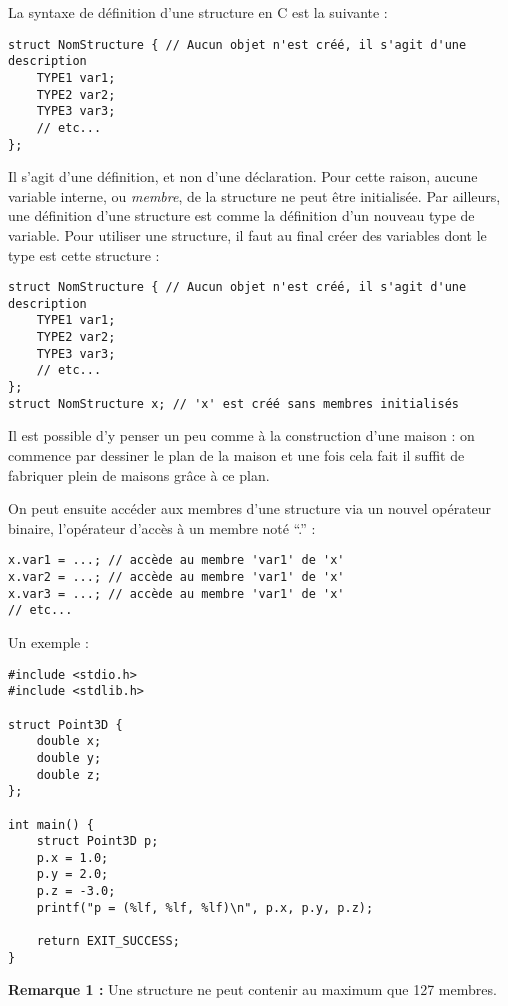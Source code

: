 \documentclass[../../../main.tex]{subfiles}
\begin{document}
La syntaxe de définition d'une structure en C est la suivante :
\begin{verbatim}
struct NomStructure { // Aucun objet n'est créé, il s'agit d'une description
	TYPE1 var1;
	TYPE2 var2;
	TYPE3 var3;
	// etc...
};
\end{verbatim}
Il s'agit d'une définition, et non d'une déclaration. Pour cette raison, aucune variable interne, ou \textit{membre}, de la structure ne peut être initialisée. Par ailleurs, une définition d'une structure est comme la définition d'un nouveau type de variable. Pour utiliser une structure, il faut au final créer des variables dont le type est cette structure :
\begin{verbatim}
struct NomStructure { // Aucun objet n'est créé, il s'agit d'une description
	TYPE1 var1;
	TYPE2 var2;
	TYPE3 var3;
	// etc...
};
struct NomStructure x; // 'x' est créé sans membres initialisés
\end{verbatim}
Il est possible d'y penser un peu comme à la construction d'une maison : on commence par dessiner le plan de la maison et une fois cela fait il suffit de fabriquer plein de maisons grâce à ce plan.
 
On peut ensuite accéder aux membres d'une structure via un nouvel opérateur binaire, l'opérateur d'accès à un membre noté ``.'' :
\begin{verbatim}
x.var1 = ...; // accède au membre 'var1' de 'x'
x.var2 = ...; // accède au membre 'var1' de 'x'
x.var3 = ...; // accède au membre 'var1' de 'x'
// etc...
\end{verbatim}
Un exemple :
\begin{verbatim}
#include <stdio.h>
#include <stdlib.h>

struct Point3D {
	double x;
	double y;
	double z;
};

int main() {
	struct Point3D p;
	p.x = 1.0;
	p.y = 2.0;
	p.z = -3.0;
	printf("p = (%lf, %lf, %lf)\n", p.x, p.y, p.z);

	return EXIT_SUCCESS;
}
\end{verbatim}
\textbf{Remarque 1 :} Une structure ne peut contenir au maximum que 127 membres.
 
\end{document}
